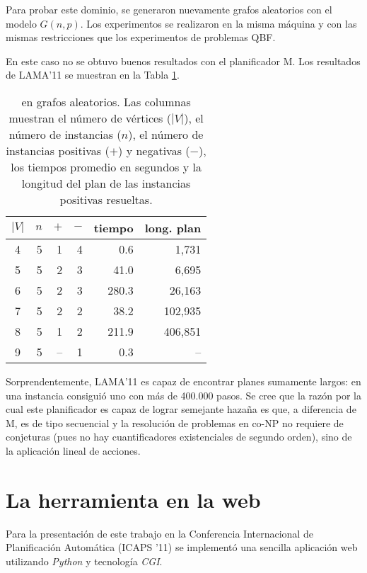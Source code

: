 Para probar este dominio, se generaron nuevamente grafos aleatorios con el modelo
$G(n,p)$. Los experimentos se realizaron en la misma máquina y con las
mismas restricciones que los experimentos de problemas QBF.

En este caso no se obtuvo buenos resultados con el planificador M.
Los resultados de LAMA'11 \citep{richter:lama} se muestran en la
Tabla \ref{table:exp:co-3col}.

\begin{table}[h!]
\centering
\begin{tabular}{crrrrr}
$|V|$ & $n$ & $+$ & $-$ &  tiempo & long. plan  \\
\midrule
    4 &   5 &   1 &   4 &   0.6 &   1,731  \\
    5 &   5 &   2 &   3 &  41.0 &   6,695  \\
    6 &   5 &   2 &   3 & 280.3 &  26,163  \\
    7 &   5 &   2 &   2 &  38.2 & 102,935  \\
    8 &   5 &   1 &   2 & 211.9 & 406,851  \\
    9 &   5 & -- &   1 &   0.3 &      -- \\
\end{tabular}
\caption[Resultados de LAMA'11 para \coCOL]{\small \coCOL en grafos aleatorios.
  Las columnas muestran el número de vértices ($|V|$), el número de instancias ($n$),
  el número de instancias positivas ($+$) y negativas ($-$), los tiempos
  promedio en segundos y la longitud del plan de las instancias positivas
  resueltas.
}
\label{table:exp:co-3col}
\end{table}

Sorprendentemente, LAMA'11 es capaz de encontrar planes sumamente largos: en
una instancia consiguió uno con más de 400.000 pasos. Se cree que la razón
por la cual este planificador es capaz de lograr semejante hazaña es que, a diferencia de M, 
es de tipo secuencial y la resolución de problemas en co-NP no requiere de
conjeturas (pues no hay cuantificadores existenciales de segundo orden), sino
de la aplicación lineal de acciones.

\section{La herramienta en la web}

Para la presentación de este trabajo en la Conferencia Internacional de
Planificación Automática (ICAPS '11) se implementó una sencilla aplicación web
utilizando \textit{Python} y tecnología \textit{CGI}.

